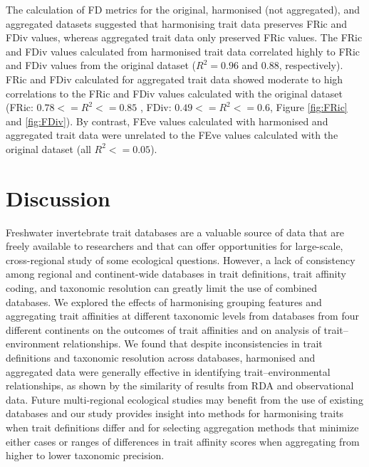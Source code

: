 \documentclass[12pt]{article}
\begin{document}
The calculation of FD metrics for the original, harmonised (not aggregated), and aggregated datasets suggested that harmonising trait data preserves FRic and FDiv values, whereas aggregated trait data only preserved FRic values. The FRic and FDiv values calculated from harmonised trait data correlated highly to FRic and FDiv values from the original dataset ($R^2 = 0.96$ and $0.88$, respectively). FRic and FDiv calculated for aggregated trait data showed moderate to high correlations to the FRic and FDiv values calculated with the original dataset (FRic: $0.78 <= R^2 <= 0.85$ , FDiv: $0.49 <= R^2 <= 0.6$, Figure \ref{fig:FRic} and \ref{fig:FDiv}). By contrast, FEve values calculated with harmonised and aggregated trait data were unrelated to the FEve values calculated with the original dataset (all $R^2 <= 0.05$).

\newpage


\section*{Discussion}

Freshwater invertebrate trait databases are a valuable source of data that are freely available to researchers and that can offer opportunities for large-scale, cross-regional study of some ecological questions. However, a lack of consistency among regional and continent-wide databases in trait definitions, trait affinity coding, and taxonomic resolution can greatly limit the use of combined databases. We explored the effects of harmonising grouping features and aggregating trait affinities at different taxonomic levels from databases from four different continents on the outcomes of trait affinities and on analysis of trait–environment relationships. We found that despite inconsistencies in trait definitions and taxonomic resolution across databases, harmonised and aggregated data were generally effective in identifying trait–environmental relationships, as shown by the similarity of results from RDA and observational data. Future multi-regional ecological studies may benefit from the use of existing databases and our study provides insight into methods for harmonising traits when trait definitions differ and for selecting aggregation methods that minimize either cases or ranges of differences in trait affinity scores when aggregating from higher to lower taxonomic precision.
\end{document}
